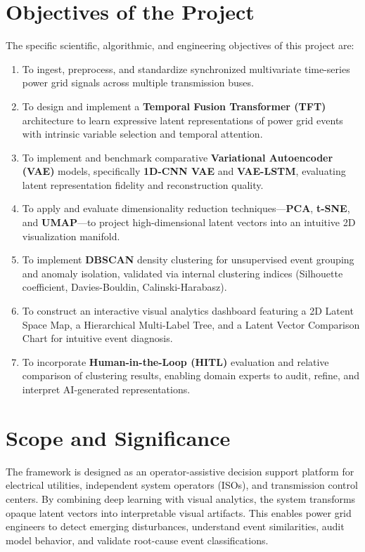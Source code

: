 \documentclass[12pt,a4paper]{report}
\begin{document}
\section{Objectives of the Project}
The specific scientific, algorithmic, and engineering objectives of this project are:
\begin{enumerate}
    \item To ingest, preprocess, and standardize synchronized multivariate time-series power grid signals across multiple transmission buses.
    \item To design and implement a \textbf{Temporal Fusion Transformer (TFT)} architecture to learn expressive latent representations of power grid events with intrinsic variable selection and temporal attention.
    \item To implement and benchmark comparative \textbf{Variational Autoencoder (VAE)} models, specifically \textbf{1D-CNN VAE} and \textbf{VAE-LSTM}, evaluating latent representation fidelity and reconstruction quality.
    \item To apply and evaluate dimensionality reduction techniques—\textbf{PCA}, \textbf{t-SNE}, and \textbf{UMAP}—to project high-dimensional latent vectors into an intuitive 2D visualization manifold.
    \item To implement \textbf{DBSCAN} density clustering for unsupervised event grouping and anomaly isolation, validated via internal clustering indices (Silhouette coefficient, Davies-Bouldin, Calinski-Harabasz).
    \item To construct an interactive visual analytics dashboard featuring a 2D Latent Space Map, a Hierarchical Multi-Label Tree, and a Latent Vector Comparison Chart for intuitive event diagnosis.
    \item To incorporate \textbf{Human-in-the-Loop (HITL)} evaluation and relative comparison of clustering results, enabling domain experts to audit, refine, and interpret AI-generated representations.
\end{enumerate}

\section{Scope and Significance}
The framework is designed as an operator-assistive decision support platform for electrical utilities, independent system operators (ISOs), and transmission control centers. By combining deep learning with visual analytics, the system transforms opaque latent vectors into interpretable visual artifacts. This enables power grid engineers to detect emerging disturbances, understand event similarities, audit model behavior, and validate root-cause event classifications.
\end{document}
